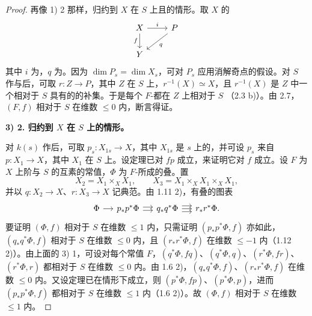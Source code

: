 \begin{proof}
再像 1) 2 那样，归约到 $X$ 在 $S$ 上且的情形。取 $X$ 的
\[
\begin{tikzcd}
X\arrow[r,"i"]\arrow[d,"f"']&P\arrow[dl,"q"]\\
Y&
\end{tikzcd}
\]
其中 $i$ 为，$q$ 为。因为 $\dim P_s=\dim X_s$，可对 $P_s$ 应用消解奇点的假设。对 $S$ 作与后，可取 $r:Z\to P$，其中 $Z$ 在 $S$ 上，$r^{-1}(X)\simeq X$，且 $r^{-1}(X)$ 是 $Z$ 中一个相对于 $S$ 具有的的补集。于是每个 $F$-都在 $Z$ 上相对于 $S$ （2.3 b)）。由 2.7，$(F,f)$ 相对于 $S$ 在维数 $\leq0$ 内，断言得证。

\textbf{3) 2. 归约到 $X$ 在 $S$ 上的情形。}

对 $k(s)$ 作后，可取 $p_s:X_{1s}\to X$，其中 $X_{1s}$ 是 $s$ 上的，并可设 $p_s$ 来自 $p:X_1\to X$，其中 $X_1$ 在 $S$ 上。设定理已对 $fp$ 成立，来证明它对 $f$ 成立。设 $F$ 为 $X$ 上阶与 $S$ 的互素的常值，$\Phi$ 为 $F$-所成的叠。置
\[X_2=X_1\times_X X_1,\qquad X_3=X_1\times_X X_1\times_X X_1,\]
并以 $q:X_2\to X$、$r:X_3\to X$ 记典范。由 1.11 2)，有叠的图表
\[
\begin{tikzcd}[column sep=small]
\Phi\arrow[r]&p_*p^*\Phi\arrow[r,shift left=.45ex]\arrow[r,shift right=.45ex]&q_*q^*\Phi\arrow[r,shift left=.8ex]\arrow[r]\arrow[r,shift right=.8ex]&r_*r^*\Phi.
\end{tikzcd}
\]
要证明 $(\Phi,f)$ 相对于 $S$ 在维数 $\leq1$ 内，只需证明 $(p_*p^*\Phi,f)$ 亦如此，$(q_*q^*\Phi,f)$ 相对于 $S$ 在维数 $\leq0$ 内，且 $(r_*r^*\Phi,f)$ 在维数 $\leq-1$ 内（1.12 2)）。由上面的 3) 1，可设对每个常值 $F$，$(q^*\Phi,fq)$、$(q^*\Phi,q)$、$(r^*\Phi,fr)$、$(r^*\Phi,r)$ 都相对于 $S$ 在维数 $\leq0$ 内。由 1.6 2)，$(q_*q^*\Phi,f)$、$(r_*r^*\Phi,f)$ 在维数 $\leq0$ 内。又设定理已在情形下成立，则 $(p^*\Phi,fp)$、$(p^*\Phi,p)$，进而 $(p_*p^*\Phi,f)$ 都相对于 $S$ 在维数 $\leq1$ 内（1.6 2)）。故 $(\Phi,f)$ 相对于 $S$ 在维数 $\leq1$ 内。


\end{proof}
